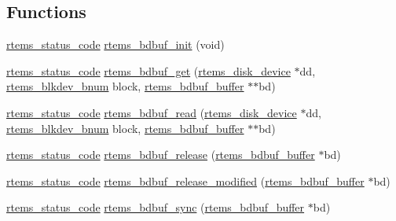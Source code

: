 \subsection*{Functions}
\begin{DoxyCompactItemize}
\item 
\mbox{\hyperlink{group__ClassicStatus_ga545d41846817eaba6143d52ee4d9e9fe}{rtems\+\_\+status\+\_\+code}} \mbox{\hyperlink{group__rtems__bdbuf_gaf19ee8ba7815e24767b6a91e200a78bc}{rtems\+\_\+bdbuf\+\_\+init}} (void)
\item 
\mbox{\hyperlink{group__ClassicStatus_ga545d41846817eaba6143d52ee4d9e9fe}{rtems\+\_\+status\+\_\+code}} \mbox{\hyperlink{group__rtems__bdbuf_ga05fa34cc25ade6d09797b0dc88cf33e1}{rtems\+\_\+bdbuf\+\_\+get}} (\mbox{\hyperlink{structrtems__disk__device}{rtems\+\_\+disk\+\_\+device}} $\ast$dd, \mbox{\hyperlink{group__rtems__disk_ga5fbcfd40b657bff6c54d9e393fab3274}{rtems\+\_\+blkdev\+\_\+bnum}} block, \mbox{\hyperlink{structrtems__bdbuf__buffer}{rtems\+\_\+bdbuf\+\_\+buffer}} $\ast$$\ast$bd)
\item 
\mbox{\hyperlink{group__ClassicStatus_ga545d41846817eaba6143d52ee4d9e9fe}{rtems\+\_\+status\+\_\+code}} \mbox{\hyperlink{group__rtems__bdbuf_ga8546cefc842eef10cdb5b38a6cead9f7}{rtems\+\_\+bdbuf\+\_\+read}} (\mbox{\hyperlink{structrtems__disk__device}{rtems\+\_\+disk\+\_\+device}} $\ast$dd, \mbox{\hyperlink{group__rtems__disk_ga5fbcfd40b657bff6c54d9e393fab3274}{rtems\+\_\+blkdev\+\_\+bnum}} block, \mbox{\hyperlink{structrtems__bdbuf__buffer}{rtems\+\_\+bdbuf\+\_\+buffer}} $\ast$$\ast$bd)
\item 
\mbox{\hyperlink{group__ClassicStatus_ga545d41846817eaba6143d52ee4d9e9fe}{rtems\+\_\+status\+\_\+code}} \mbox{\hyperlink{group__rtems__bdbuf_ga005a3a396079975d67eac6de5640d744}{rtems\+\_\+bdbuf\+\_\+release}} (\mbox{\hyperlink{structrtems__bdbuf__buffer}{rtems\+\_\+bdbuf\+\_\+buffer}} $\ast$bd)
\item 
\mbox{\hyperlink{group__ClassicStatus_ga545d41846817eaba6143d52ee4d9e9fe}{rtems\+\_\+status\+\_\+code}} \mbox{\hyperlink{group__rtems__bdbuf_ga3f8af85cf0abcb0858811f74130aa6c7}{rtems\+\_\+bdbuf\+\_\+release\+\_\+modified}} (\mbox{\hyperlink{structrtems__bdbuf__buffer}{rtems\+\_\+bdbuf\+\_\+buffer}} $\ast$bd)
\item 
\mbox{\hyperlink{group__ClassicStatus_ga545d41846817eaba6143d52ee4d9e9fe}{rtems\+\_\+status\+\_\+code}} \mbox{\hyperlink{group__rtems__bdbuf_ga9a49c1519760b60eace0463277af50ee}{rtems\+\_\+bdbuf\+\_\+sync}} (\mbox{\hyperlink{structrtems__bdbuf__buffer}{rtems\+\_\+bdbuf\+\_\+buffer}} $\ast$bd)

\end{DoxyCompactItemize}
